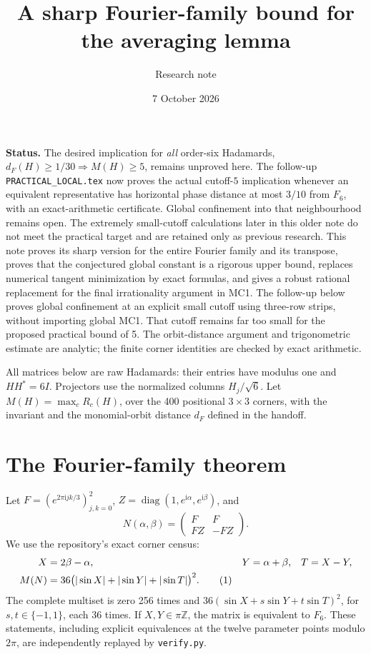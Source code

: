 \documentclass[11pt]{article}
\title{A sharp Fourier-family bound for the averaging lemma}
\author{Research note}
\date{7 October 2026}
\newcommand{\ii}{\mathrm i}
\begin{document}
\maketitle
\noindent\textbf{Status.} The desired implication for \emph{all} order-six
Hadamards, $d_F(H)\ge 1/30\Rightarrow M(H)\ge5$, remains unproved here.
The follow-up \texttt{PRACTICAL\_LOCAL.tex} now proves the actual cutoff-$5$
implication whenever an equivalent representative has horizontal phase
distance at most $3/10$ from $F_6$, with an exact-arithmetic certificate.
Global confinement into that neighbourhood remains open. The extremely
small-cutoff calculations later in this older note do not meet the practical
target and are retained only as previous research.
This note proves its sharp version for the entire Fourier family and its
transpose, proves that the conjectured global constant is a rigorous upper
bound, replaces numerical tangent minimization by exact formulas, and gives
a robust rational replacement for the final irrationality argument in MC1.
The follow-up below proves global confinement at an explicit small cutoff
using three-row strips, without importing global MC1. That cutoff remains
far too small for the proposed practical bound of 5.
The orbit-distance argument and trigonometric estimate are analytic;
the finite corner identities are checked by exact arithmetic.

All matrices below are raw Hadamards: their entries have modulus one and
$HH^*=6I$. Projectors use the normalized columns $H_j/\sqrt6$.
Let $M(H)=\max_c R_c(H)$, over the 400 positional $3\times3$ corners,
with the invariant and the monomial-orbit distance $d_F$ defined in the handoff.

\section{The Fourier-family theorem}
Let $F=(e^{2\pi\ii jk/3})_{j,k=0}^2$, $Z=\operatorname{diag}(1,e^{\ii\alpha},e^{\ii\beta})$, and
\[
 N(\alpha,\beta)=\begin{pmatrix}F&F\\FZ&-FZ\end{pmatrix}.
\]
We use the repository's exact corner census:
\begin{align}
 X&=2\beta-\alpha,&Y&=\alpha+\beta,&T&=X-Y,\notag\\
 M(N)&=36\bigl(|\sin X|+|\sin Y|+|\sin T|\bigr)^2.\tag{1}
\end{align}
The complete multiset is zero 256 times and
$36(\sin X+s\sin Y+t\sin T)^2$, for $s,t\in\{-1,1\}$,
each 36 times. If $X,Y\in\pi\mathbb Z$, the matrix is equivalent to $F_6$.
These statements, including explicit equivalences at the twelve parameter
points modulo $2\pi$, are independently replayed by \texttt{verify.py}.
\end{document}

